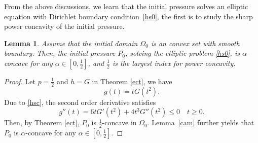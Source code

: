 \documentclass[10pt]{article}         %
\newtheorem{lemma}{Lemma}[section]
\numberwithin{equation}{section}
\begin{document}
From the above discussions, we learn that  the initial pressure solves an elliptic equation with Dirichlet boundary condition~\eqref{hs0}, the first is to study the sharp power concavity of the initial pressure. 
\begin{lemma}
    Assume that the initial domain $\Omega_0$ is an convex set with smooth boundary. Then, the initial pressure $P_0$, solving the elliptic problem \eqref{hs0},  is $\alpha$-concave for any $\alpha\in[0,\frac{1}{2}]$, and  $\frac{1}{2}$ is the largest index for power concavity.
\end{lemma}
\begin{proof}Let $p=\frac{1}{2}$ and $h=G$ in Theorem \ref{ect}, we have 
\begin{equation*}g(t)=
 tG(t^2).
 \end{equation*}
Due to \eqref{hsc}, the second order derivative satisfies 
\begin{equation*}g''(t)=6tG'(t^2)+4t^3G''(t^2)\leq 0\quad t\geq0.
 \end{equation*}
Then,  by Theorem \ref{ect}, $P_0$ is $\frac{1}{2}$-concave in $\Omega_0$. Lemma~\ref{cam} further yields that  $P_0$ is $\alpha$-concave for any $\alpha\in[0,\frac{1}{2}]$.


\vspace{2mm}


\end{proof}
\end{document}
